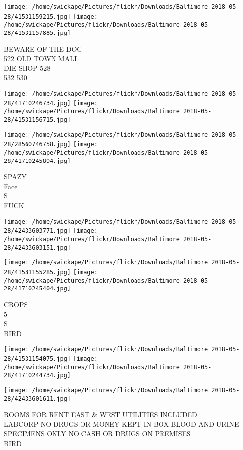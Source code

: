 \documentclass[10pt,letterpaper]{article}
\begin{document}
\texttt{[image: /home/swickape/Pictures/flickr/Downloads/Baltimore 2018-05-28/41531159215.jpg]}
\texttt{[image: /home/swickape/Pictures/flickr/Downloads/Baltimore 2018-05-28/41531157885.jpg]}

BEWARE OF THE DOG\\
522 OLD TOWN MALL\\
DIE SHOP 528\\
532 530\\
\pagebreak

\texttt{[image: /home/swickape/Pictures/flickr/Downloads/Baltimore 2018-05-28/41710246734.jpg]}
\texttt{[image: /home/swickape/Pictures/flickr/Downloads/Baltimore 2018-05-28/41531156715.jpg]}

\texttt{[image: /home/swickape/Pictures/flickr/Downloads/Baltimore 2018-05-28/28560746758.jpg]}
\texttt{[image: /home/swickape/Pictures/flickr/Downloads/Baltimore 2018-05-28/41710245894.jpg]}

SPAZY\\
Face\\
S\\
FUCK\\
\pagebreak

\texttt{[image: /home/swickape/Pictures/flickr/Downloads/Baltimore 2018-05-28/42433603771.jpg]}
\texttt{[image: /home/swickape/Pictures/flickr/Downloads/Baltimore 2018-05-28/42433603151.jpg]}

\texttt{[image: /home/swickape/Pictures/flickr/Downloads/Baltimore 2018-05-28/41531155285.jpg]}
\texttt{[image: /home/swickape/Pictures/flickr/Downloads/Baltimore 2018-05-28/41710245404.jpg]}

CROPS\\
5\\
S\\
BIRD\\
\pagebreak

\texttt{[image: /home/swickape/Pictures/flickr/Downloads/Baltimore 2018-05-28/41531154075.jpg]}
\texttt{[image: /home/swickape/Pictures/flickr/Downloads/Baltimore 2018-05-28/41710244734.jpg]}

\texttt{[image: /home/swickape/Pictures/flickr/Downloads/Baltimore 2018-05-28/42433601611.jpg]}

ROOMS FOR RENT EAST \& WEST UTILITIES INCLUDED\\
LABCORP NO DRUGS OR MONEY KEPT IN BOX BLOOD AND URINE SPECIMENS ONLY NO CASH OR DRUGS ON PREMISES\\
BIRD\\
\pagebreak
\end{document}
